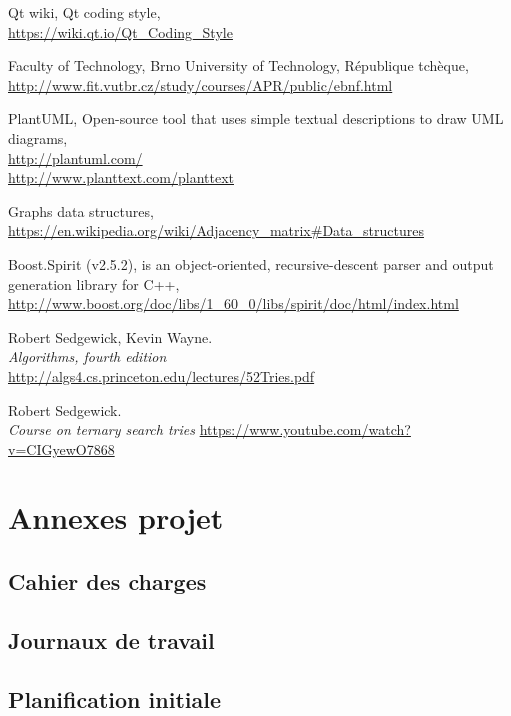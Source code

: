 \documentclass[french]{article}
\begin{document}
		\begin{thebibliography}{9}
			Qt wiki, Qt coding style,\\ \url{https://wiki.qt.io/Qt_Coding_Style}
			
			Faculty of Technology, Brno University of Technology, République tchèque,\\ \url{http://www.fit.vutbr.cz/study/courses/APR/public/ebnf.html}
			
			PlantUML, Open-source tool that uses simple textual descriptions to draw UML diagrams,\\ \url{http://plantuml.com/}\\ \url{http://www.planttext.com/planttext}
			
			Graphs data structures,\\ \url{https://en.wikipedia.org/wiki/Adjacency_matrix#Data_structures}
			
			Boost.Spirit (v2.5.2), is an object-oriented, recursive-descent parser and output generation library for C++,\\ \url{http://www.boost.org/doc/libs/1_60_0/libs/spirit/doc/html/index.html}
			
			Robert Sedgewick, Kevin Wayne.\\
			\emph{Algorithms, fourth edition}\\
			\url{http://algs4.cs.princeton.edu/lectures/52Tries.pdf}
			
			Robert Sedgewick.\\
			\emph{Course on ternary search tries}
			\url{https://www.youtube.com/watch?v=CIGyewO7868}
		\end{thebibliography}	
		
	\section{Annexes projet}
		\subsection{Cahier des charges}
			
		\subsection{Journaux de travail}
			
		\subsection{Planification initiale}
				
				
				
				
				
				
\end{document}

